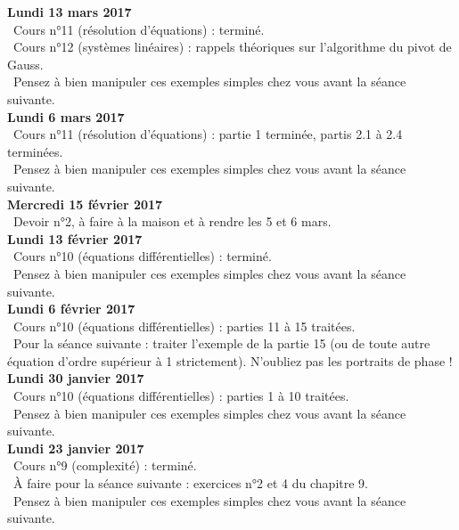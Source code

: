 \documentclass[12pt,a4paper]{article}
\begin{document}
\noindent\textbf{Lundi 13 mars 2017}\\
\bu\ Cours n°11 (résolution d'équations) : terminé. \\
\bu\ Cours n°12 (systèmes linéaires) : rappels théoriques sur l'algorithme du pivot de Gauss.\\
\bu\ Pensez à bien manipuler ces exemples simples chez vous avant la séance suivante. \vspace{.4cm}\\

\noindent\textbf{Lundi 6 mars 2017}\\
\bu\ Cours n°11 (résolution d'équations) : partie 1 terminée, partis 2.1 à 2.4 terminées. \\
\bu\ Pensez à bien manipuler ces exemples simples chez vous avant la séance suivante. \vspace{.4cm}\\

\noindent\textbf{Mercredi 15 février 2017}\\
\bu\ Devoir n°2, à faire à la maison et à rendre les 5 et 6 mars. \vspace{.4cm}\\

\noindent\textbf{Lundi 13 février 2017}\\
\bu\ Cours n°10 (équations différentielles) : terminé. \\
\bu\ Pensez à bien manipuler ces exemples simples chez vous avant la séance suivante. \vspace{.4cm}\\

\noindent\textbf{Lundi 6 février 2017}\\
\bu\ Cours n°10 (équations différentielles) : parties 11 à 15 traitées. \\
\bu\ Pour la séance suivante : traiter l'exemple de la partie 15 (ou de toute autre équation d'ordre supérieur à 1 strictement). N'oubliez pas les portraits de phase ! \vspace{.4cm}\\

\noindent\textbf{Lundi 30 janvier 2017}\\
\bu\ Cours n°10 (équations différentielles) : parties 1 à 10 traitées. \\
\bu\ Pensez à bien manipuler ces exemples simples chez vous avant la séance suivante. \vspace{.4cm}\\

\noindent\textbf{Lundi 23 janvier 2017}\\
\bu\ Cours n°9 (complexité) : terminé. \\
\bu\ À faire pour la séance suivante : exercices n°2 et 4 du chapitre 9.\\
\bu\ Pensez à bien manipuler ces exemples simples chez vous avant la séance suivante. \vspace{.4cm}\\
\end{document}
